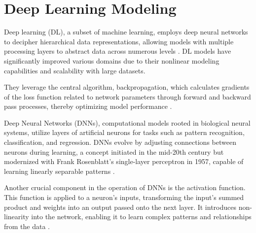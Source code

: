 \section{Deep Learning Modeling}

Deep learning (DL), a subset of machine learning, employs deep neural networks to decipher hierarchical data representations, allowing models with multiple processing layers to abstract data across numerous levels \cite{LeCun2015DeepLearning}. DL models have significantly improved various domains due to their nonlinear modeling capabilities and scalability with large datasets.

They leverage the central algorithm, backpropagation, which calculates gradients of the loss function related to network parameters through forward and backward pass processes, thereby optimizing model performance \cite{Rumelhart1986LearningInternal}.



Deep Neural Networks (DNNs), computational models rooted in biological neural systems, utilize layers of artificial neurons for tasks such as pattern recognition, classification, and regression. DNNs evolve by adjusting connections between neurons during learning, a concept initiated in the mid-20th century but modernized with Frank Rosenblatt's single-layer perceptron in 1957, capable of learning linearly separable patterns \cite{Rosenblatt1958ThePerceptron}.



Another crucial component in the operation of DNNs is the activation function. This function is applied to a neuron's inputs, transforming the input's summed product and weights into an output passed onto the next layer. It introduces non-linearity into the network, enabling it to learn complex patterns and relationships from the data \cite{Goodfellow2016DeepLearning}.



\newpage